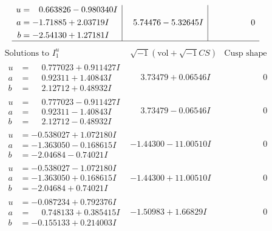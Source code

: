 \documentclass[1p]{elsarticle_modified}
\theoremstyle{definition}
\newcommand{\I}{\sqrt{-1}}
\begin{document}
$$\begin{array}{c|c|c}
\begin{aligned}
u &= \phantom{-}0.663826 - 0.980340 I \\
a &= -1.71885 + 2.03719 I \\
b &= -2.54130 + 1.27181 I\end{aligned}
 & \phantom{-}5.74476 - 5.32645 I & \phantom{-0.000000 } 0\\
 \hline 
 \end{array}$$\newpage$$\begin{array}{c|c|c}  
\text{Solutions to }I^u_{1}& \I (\text{vol} + \sqrt{-1}CS) & \text{Cusp shape}\\
 \hline 
\begin{aligned}
u &= \phantom{-}0.777023 + 0.911427 I \\
a &= \phantom{-}0.92311 + 1.40843 I \\
b &= \phantom{-}2.12712 + 0.48932 I\end{aligned}
 & \phantom{-}3.73479 + 0.06546 I & \phantom{-0.000000 } 0 \\ \hline\begin{aligned}
u &= \phantom{-}0.777023 - 0.911427 I \\
a &= \phantom{-}0.92311 - 1.40843 I \\
b &= \phantom{-}2.12712 - 0.48932 I\end{aligned}
 & \phantom{-}3.73479 - 0.06546 I & \phantom{-0.000000 } 0 \\ \hline\begin{aligned}
u &= -0.538027 + 1.072180 I \\
a &= -1.363050 - 0.168615 I \\
b &= -2.04684 - 0.74021 I\end{aligned}
 & -1.44300 - 11.00510 I & \phantom{-0.000000 } 0 \\ \hline\begin{aligned}
u &= -0.538027 - 1.072180 I \\
a &= -1.363050 + 0.168615 I \\
b &= -2.04684 + 0.74021 I\end{aligned}
 & -1.44300 + 11.00510 I & \phantom{-0.000000 } 0 \\ \hline\begin{aligned}
u &= -0.087234 + 0.792376 I \\
a &= \phantom{-}0.748133 + 0.385415 I \\
b &= -0.155133 + 0.214003 I\end{aligned}
 & -1.50983 + 1.66829 I & \phantom{-0.000000 } 0 \\ \hline\begin{aligned}

\end{aligned}
\end{array}$$
\end{document}
